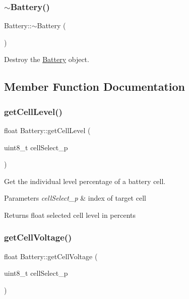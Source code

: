 \subsubsection{\texorpdfstring{$\sim$\+Battery()}{~Battery()}}
{\footnotesize\ttfamily Battery\+::$\sim$\+Battery (\begin{DoxyParamCaption}{ }\end{DoxyParamCaption})}



Destroy the \hyperlink{class_battery}{Battery} object. 



\subsection{Member Function Documentation}
\mbox{\label{class_battery_a810c22577141039b044fdf59a9f9bdef}} 
\subsubsection{\texorpdfstring{get\+Cell\+Level()}{getCellLevel()}}
{\footnotesize\ttfamily float Battery\+::get\+Cell\+Level (\begin{DoxyParamCaption}\item[{uint8\+\_\+t}]{cell\+Select\+\_\+p }\end{DoxyParamCaption})}



Get the individual level percentage of a battery cell. 


\begin{DoxyParams}{Parameters}
{\em cell\+Select\+\_\+p} & index of target cell \\
\hline
\end{DoxyParams}
\begin{DoxyReturn}{Returns}
float selected cell level in percents 
\end{DoxyReturn}
\mbox{\label{class_battery_ae449209593f825ca7cefc958d51ba232}} 
\subsubsection{\texorpdfstring{get\+Cell\+Voltage()}{getCellVoltage()}}
{\footnotesize\ttfamily float Battery\+::get\+Cell\+Voltage (\begin{DoxyParamCaption}\item[{uint8\+\_\+t}]{cell\+Select\+\_\+p }\end{DoxyParamCaption})}



